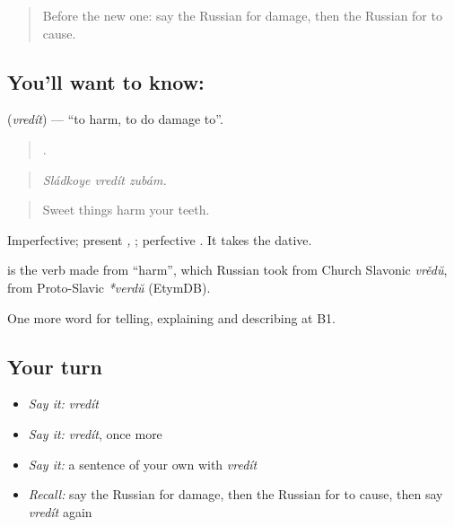 \label{lesson:RU-C353-vredit}



\begin{quote}
Before the new one: say the Russian for damage, then the Russian for to cause.
\end{quote}

\subsection*{You'll want to know: }
\textbf{} (\emph{vredít}) — \textquotedblleft{}to harm, to do damage to\textquotedblright{}.

\begin{quote}
  .
\end{quote}

\begin{quote}
\emph{Sládkoye vredít zubám.}
\end{quote}

\begin{quote}
Sweet things harm your teeth.
\end{quote}

Imperfective; present \emph{, }; perfective \emph{}. It takes the dative.

\begin{cousinweb}
\textbf{} is the verb made from \emph{} \textquotedblleft{}harm\textquotedblright{}, which Russian took from Church Slavonic \emph{vrědŭ}, from Proto-Slavic \emph{*verdŭ} (EtymDB).
\end{cousinweb}

\begin{grammarlens}[title={What you've built}]
One more word for telling, explaining and describing at B1.
\end{grammarlens}

\subsection*{Your turn}
\begin{itemize}
\raggedright
  \item \emph{Say it:} \emph{vredít}
  \item \emph{Say it:} \emph{vredít}, once more
  \item \emph{Say it:} a sentence of your own with \emph{vredít}
  \item \emph{Recall:} say the Russian for damage, then the Russian for to cause, then say \emph{vredít} again
\end{itemize}

